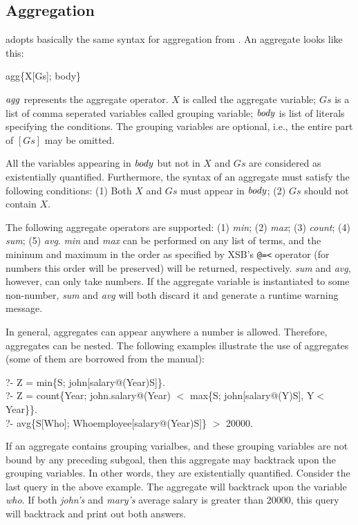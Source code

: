 \documentclass[11pt]{report}
\begin{document}
\subsection{Aggregation}

\FLORA adopts basically the same syntax for aggregation from \FLORID. An aggregate
looks like this:
\begin{qrules}
agg\{X[Gs]; body\}
\end{qrules}
${\it agg}$ represents the aggregate operator. $X$ is called the aggregate variable; $Gs$ is
a list of comma seperated variables called grouping variable; ${\it body}$ is list of literals
specifying the conditions. The grouping variables are optional, i.e., the entire part of
$[Gs]$ may be omitted.

All the variables appearing in ${\it body}$ but not in $X$ and $Gs$ are considered as
existentially quantified. Furthermore, the syntax of an aggregate must satisfy the following
conditions: (1) Both $X$ and $Gs$ must appear in ${\it body}$; (2) $Gs$ should not contain $X$.

The following aggregate operators are supported: (1) {\it min}; (2) {\it max}; (3) {\it count};
(4) {\it sum}; (5) {\it avg}. {\it min} and {\it max} can be performed on any list of terms,
and the mininum and maximum in the order as specified by XSB's {\tt @=<} operator (for numbers
this order will be preserved) will be returned, respectively. {\it sum} and {\it avg}, however,
can only take numbers. If the aggregate variable is instantiated to some non-number,
{\it sum} and {\it avg} will both discard it and generate a runtime warning message.

In general, aggregates can appear anywhere a number is allowed. Therefore, aggregates can
be nested. The following examples illustrate the use of aggregates (some of them are borrowed
from the \FLORID manual):
\begin{qrules}
?- Z = min\{S; john[salary@(Year){\fd}S]\}. \\
?- Z = count\{Year; john.salary@(Year) $<$ max\{S; john[salary@(Y){\fd}S], Y$<$Year\}\}. \\
?- avg\{S[Who]; Who{\isa}employee[salary@(Year){\fd}S]\} $>$ 20000.
\end{qrules}

If an aggregate contains grouping varialbes, and these grouping variables are not bound
by any preceding subgoal, then this aggregate may backtrack upon the grouping variables. In
other words, they are existentially quantified. Consider the last query in the above example.
The aggregate will backtrack upon the variable {\it who}. If both {\it john's} and {\it mary's}
average salary is greater than 20000, this query will backtrack and print out both answers.
\end{document}
